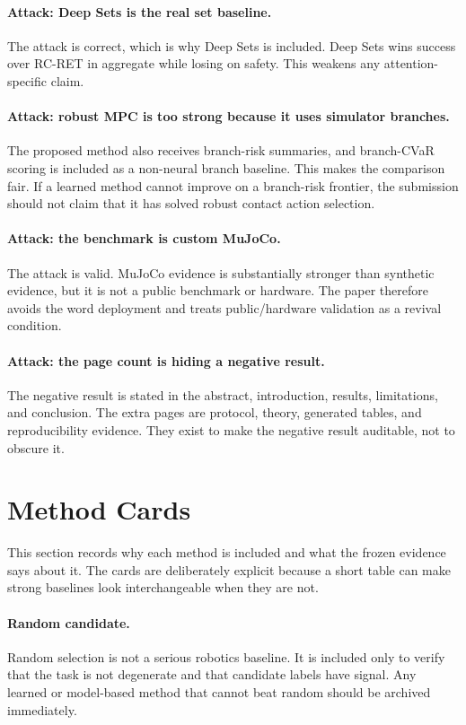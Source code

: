 \documentclass{article}
\newcommand{\method}{RC-RET}
\begin{document}
\paragraph{Attack: Deep Sets is the real set baseline.}
The attack is correct, which is why Deep Sets is included.  Deep Sets wins success over \method{} in aggregate while losing on safety.  This weakens any attention-specific claim.

\paragraph{Attack: robust MPC is too strong because it uses simulator branches.}
The proposed method also receives branch-risk summaries, and branch-CVaR scoring is included as a non-neural branch baseline.  This makes the comparison fair.  If a learned method cannot improve on a branch-risk frontier, the submission should not claim that it has solved robust contact action selection.

\paragraph{Attack: the benchmark is custom MuJoCo.}
The attack is valid.  MuJoCo evidence is substantially stronger than synthetic evidence, but it is not a public benchmark or hardware.  The paper therefore avoids the word deployment and treats public/hardware validation as a revival condition.

\paragraph{Attack: the page count is hiding a negative result.}
The negative result is stated in the abstract, introduction, results, limitations, and conclusion.  The extra pages are protocol, theory, generated tables, and reproducibility evidence.  They exist to make the negative result auditable, not to obscure it.

\section{Method Cards}

This section records why each method is included and what the frozen evidence says about it.  The cards are deliberately explicit because a short table can make strong baselines look interchangeable when they are not.

\paragraph{Random candidate.}
Random selection is not a serious robotics baseline.  It is included only to verify that the task is not degenerate and that candidate labels have signal.  Any learned or model-based method that cannot beat random should be archived immediately.
\end{document}
